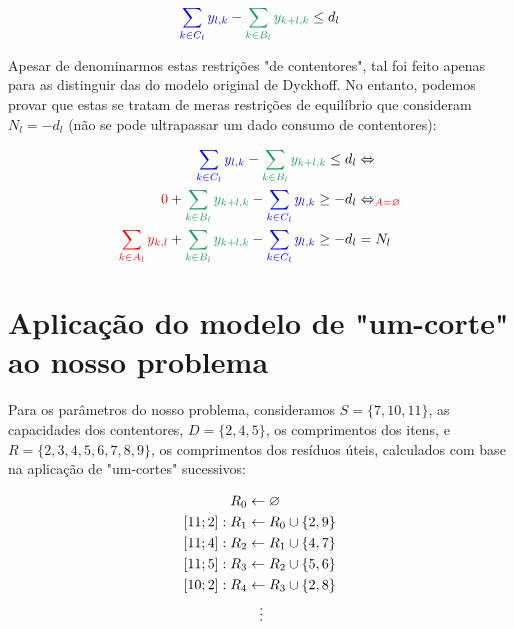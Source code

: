 \documentclass[12pt, a4paper, titlepage]{article}
\begin{document}
\begin{equation}
    {\color{blue} \sum_{k \in C_l} y_{l,k}} -
    {\color{ForestGreen} \sum_{k \in B_l} y_{k + l, k}} \leq d_l
    \label{eq:container-restriction}
\end{equation}

Apesar de denominarmos estas restrições "de contentores"{}, tal foi feito apenas para as distinguir
das do modelo original de Dyckhoff. No entanto, podemos provar que estas se tratam de meras
restrições de equilíbrio que consideram $N_l = -d_l$ (não se pode ultrapassar um dado consumo de
contentores):

\begin{equation}
    \begin{split}
        \nonumber
        {\color{blue} \sum_{k \in C_l} y_{l,k}} -
        {\color{ForestGreen} \sum_{k \in B_l} y_{k + l, k}} \leq d_l
        & \Leftrightarrow \\
        \nonumber
        {\color{red} 0} +
        {\color{ForestGreen} \sum_{k \in B_l} y_{k + l, k}} -
        {\color{blue} \sum_{k \in C_l} y_{l,k}} \geq - d_l
        & \Leftrightarrow_{\color{red} A = \varnothing} \\
        \nonumber
        {\color{red} \sum_{k \in A_l} y_{k, l}} +
        {\color{ForestGreen} \sum_{k \in B_l} y_{k + l, k}} -
        {\color{blue} \sum_{k \in C_l} y_{l,k}} \geq - d_l & = N_l
    \end{split}
\end{equation}

\section{Aplicação do modelo de "um-corte"{} ao nosso problema}

Para os parâmetros do nosso problema, consideramos $S = \{ 7, 10, 11 \}$, as capacidades dos
contentores, $D = \{ 2, 4, 5 \}$, os comprimentos dos itens, e $R = \{ 2, 3, 4, 5, 6, 7, 8, 9 \}$,
os comprimentos dos resíduos úteis, calculados com base na aplicação de "um-cortes"{} sucessivos:

\begin{equation}
    \begin{split}
        R_0           & \leftarrow  \varnothing \\
        [11; 2]: R_1 & \leftarrow R_0 \cup \{ 2, 9 \} \\
        [11; 4]: R_2 & \leftarrow R_1 \cup \{ 4, 7 \} \\
        [11; 5]: R_3 & \leftarrow R_2 \cup \{ 5, 6 \} \\
        [10; 2]: R_4 & \leftarrow R_3 \cup \{ 2, 8 \} \\
                     & \hspace{3mm} \vdots \nonumber
    \end{split} \nonumber
\end{equation}
\end{document}
